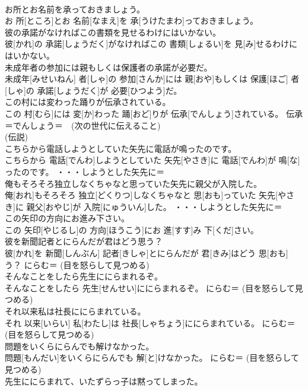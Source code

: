 \documentclass[8pt]{extreport}
\begin{document}
\begin{CJK}{UTF8}{min}
\\	お所とお名前を承っておきましょう。	
\\	お 所[ところ]とお 名前[なまえ]を 承[うけたまわ]っておきましょう。	
\\	彼の承諾がなければこの書類を見せるわけにはいかない。	
\\	彼[かれ]の 承諾[しょうだく]がなければこの 書類[しょるい]を 見[み]せるわけにはいかない。	
\\	未成年者の参加には親もしくは保護者の承諾が必要だ。	
\\	未成年[みせいねん] 者[しゃ]の 参加[さんか]には 親[おや]もしくは 保護[ほご] 者[しゃ]の 承諾[しょうだく]が 必要[ひつよう]だ。	
\\	この村には変わった踊りが伝承されている。	
\\	この 村[むら]には 変[か]わった 踊[おど]りが 伝承[でんしょう]されている。	伝承＝でんしょう＝　(次の世代に伝えること) 
\\	(伝説) 
\\	こちらから電話しようとしていた矢先に電話が鳴ったのです。	
\\	こちらから 電話[でんわ]しようとしていた 矢先[やさき]に 電話[でんわ]が 鳴[な]ったのです。	・・・しようとした矢先に＝　
\\	俺もそろそろ独立しなくちゃなと思っていた矢先に親父が入院した。	
\\	俺[おれ]もそろそろ 独立[どくりつ]しなくちゃなと 思[おも]っていた 矢先[やさき]に 親父[おやじ]が 入院[にゅういん]した。	・・・しようとした矢先に＝　
\\	この矢印の方向にお進み下さい。	
\\	この 矢印[やじるし]の 方向[ほうこう]にお 進[すす]み 下[くだ]さい。	
\\	彼を新聞記者とにらんだが君はどう思う？	
\\	彼[かれ]を 新聞[しんぶん] 記者[きしゃ]とにらんだが 君[きみ]はどう 思[おも]う？	にらむ＝ (目を怒らして見つめる) 
\\	そんなことをしたら先生ににらまれるぞ。	
\\	そんなことをしたら 先生[せんせい]ににらまれるぞ。	にらむ＝ (目を怒らして見つめる) 
\\	それ以来私は社長ににらまれている。	
\\	それ 以来[いらい] 私[わたし]は 社長[しゃちょう]ににらまれている。	にらむ＝ (目を怒らして見つめる) 
\\	問題をいくらにらんでも解けなかった。	
\\	問題[もんだい]をいくらにらんでも 解[と]けなかった。	にらむ＝ (目を怒らして見つめる) 
\\	先生ににらまれて、いたずらっ子は黙ってしまった。	

\end{CJK}
\end{document}
